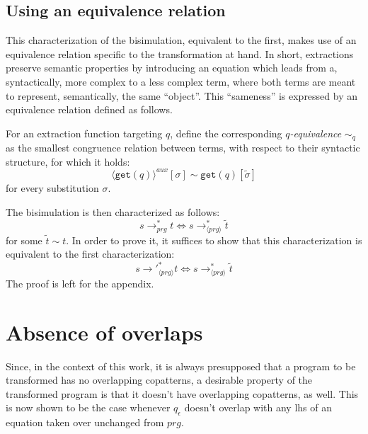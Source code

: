 \subsection{Using an equivalence relation}

This characterization of the bisimulation, equivalent to the first, makes use of an equivalence relation specific to the transformation at hand. In short, extractions preserve semantic properties by introducing an equation which leads from a, syntactically, more complex to a less complex term, where both terms are meant to represent, semantically, the same ``object''. This ``sameness'' is expressed by an equivalence relation defined as follows.

\begin{definition}[$q$-equivalence]
For an extraction function targeting $q$, define the corresponding \textit{$q$-equivalence} $\sim_q$ as the smallest congruence relation between terms, with respect to their syntactic structure, for which it holds:
\[
\langle \mathtt{get}(q) \rangle^{aux}[\sigma] \sim \mathtt{get}(q)[\widetilde{\sigma}]
\]
for every substitution $\sigma$.
\end{definition}

The bisimulation is then characterized as follows:
\[
s {\longrightarrow}_{prg}^* t \iff s \longrightarrow^*_{\langle prg \rangle} \widetilde{t}
\]
for some $\widetilde{t} \sim t$. In order to prove it, it suffices to show that this characterization is equivalent to the first characterization:
\begin{equation}
s {\longrightarrow'}_{\langle prg \rangle}^* t \iff s \longrightarrow^*_{\langle prg \rangle} \widetilde{t}
\end{equation}
 The proof is left for the appendix.

\section{Absence of overlaps}

Since, in the context of this work, it is always presupposed that a program to be transformed has no overlapping copatterns, a desirable property of the transformed program is that it doesn't have overlapping copatterns, as well. This is now shown to be the case whenever $q_\epsilon$ doesn't overlap with any lhs of an equation taken over unchanged from $prg$.

